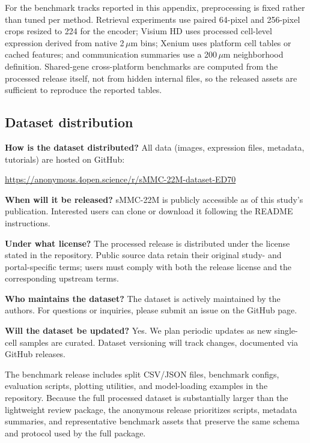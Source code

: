 \documentclass[sigconf,review]{acmart}
\newcommand{\dataset}{sMMC-22M\xspace}
\newcommand{\datasheetq}[1]{\par\noindent\textbf{#1}\enspace}
\begin{document}
For the benchmark tracks reported in this appendix, preprocessing is fixed rather than tuned per method. Retrieval experiments use paired 64-pixel and 256-pixel crops resized to 224 for the encoder; Visium HD uses processed cell-level expression derived from native 2\,$\mu$m bins; Xenium uses platform cell tables or cached features; and communication summaries use a 200\,$\mu$m neighborhood definition. Shared-gene cross-platform benchmarks are computed from the processed release itself, not from hidden internal files, so the released assets are sufficient to reproduce the reported tables.


\subsection{Dataset distribution}
\datasheetq{How is the dataset distributed?}
All data (images, expression files, metadata, tutorials) are hosted on GitHub:
\begin{center}
\url{https://anonymous.4open.science/r/sMMC-22M-dataset-ED70}
\end{center}

\datasheetq{When will it be released?}
\dataset is publicly accessible as of this study’s publication. Interested users can clone or download it following the README instructions.

\datasheetq{Under what license?}
The processed release is distributed under the license stated in the
repository. Public source data retain their original study- and
portal-specific terms; users must comply with both the release license and the
corresponding upstream terms.

\datasheetq{Who maintains the dataset?}
The dataset is actively maintained by the authors. For questions or inquiries, please submit an issue on the GitHub page.

\datasheetq{Will the dataset be updated?}
Yes. We plan periodic updates as new single-cell samples are curated. Dataset versioning will track changes, documented via GitHub releases.

The benchmark release includes split CSV/JSON files, benchmark configs, evaluation scripts, plotting utilities, and model-loading examples in the repository. Because the full processed dataset is substantially larger than the lightweight review package, the anonymous release prioritizes scripts, metadata summaries, and representative benchmark assets that preserve the same schema and protocol used by the full package.
\end{document}
